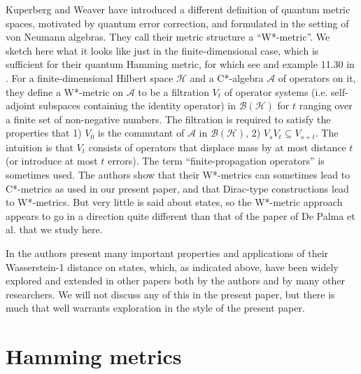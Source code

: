 \documentclass{amsart}[14pt]
\theoremstyle{definition}
\theoremstyle{remark}
\newcommand{\cA}{{\mathcal A}}
\newcommand{\cB}{{\mathcal B}}
\newcommand{\cH}{{\mathcal H}}
\newcommand{\<}{\langle}
\renewcommand{\>}{\rangle}
\numberwithin{equation}{section}
\begin{document}
{Kuperberg and Weaver \cite{KpW} have introduced a different definition
of quantum metric spaces, motivated by quantum error correction, and
formulated in the setting of von Neumann algebras.
They call their metric structure a ``W*-metric''.
 We sketch here what
it looks like just in the finite-dimensional case, which is sufficient for their
quantum Hamming metric, for which see \cite{KpW} and 
example 11.30 in \cite{Wvr4}. 
For a finite-dimensional Hilbert space $\cH$ and  a C*-algebra $\cA$ of 
operators on it, they define a W*-metric on $\cA$
to be a filtration $V_t$ of operator systems (i.e. self-adjoint subspaces
containing the identity operator) in $\cB(\cH)$ for
$t$ ranging over a finite set of non-negative numbers.
The filtration is required to satisfy the properties that 1) $V_0$ is
the commutant of $\cA$ in $\cB(\cH)$, 2) $V_s V_t \subseteq V_{s+t}$.
The intuition is that $V_t$ consists of operators that displace
mass by at most distance $t$ (or introduce at most $t$ errors). 
The term ``finite-propagation 
operators'' is sometimes used. 
The authors show that their W*-metrics can sometimes lead to 
C*-metrics as used in our present paper, and that Dirac-type
constructions lead to W*-metrics. But very little is said about
states, so the W*-metric approach appears to go in a 
direction quite different than that of the 
paper \cite{DMTL} of De Palma et al.
that we study here.

In \cite{DMTL} the authors present many important properties
and applications of their
Wasserstein-1 distance on states, which, as indicated
above, have been widely explored and extended in other papers both
by the authors and by many other researchers. We will
not discuss any of this in the present paper, but there
is much that well warrants
exploration in the style of the present paper.

\tableofcontents


\section{Hamming metrics}
\label{secprim}

}
\end{document}

